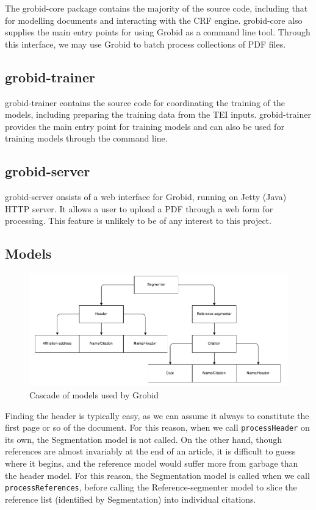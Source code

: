 \documentclass[11pt, oneside]{scrartcl}   	%
\begin{document}
The grobid-core package contains the majority of the source code, including that for modelling documents and interacting with the CRF engine. grobid-core also supplies the main entry points for using Grobid as a command line tool. Through this interface, we may use Grobid to batch process collections of PDF files.

\subsection{grobid-trainer}

grobid-trainer contains the source code for coordinating the training of the models, including preparing the training data from the TEI inputs. grobid-trainer provides the main entry point for training models and can also be used for training models through the command line.

\subsection{grobid-server}

grobid-server onsists of a web interface for Grobid, running on Jetty (Java) HTTP server. It allows a user to upload a PDF through a web form for processing. This feature is unlikely to be of any interest to this project.

\subsection{Models}

\begin{figure}[!ht]
\center
\includegraphics[width=7in]{figures/cascade.pdf}
\caption{Cascade of models used by Grobid}
\label{fig:cascade}
\end{figure}

Finding the header is typically easy, as we can assume it always to constitute the first page or so of the document. For this reason, when we call \texttt{processHeader} on its own, the Segmentation model is not called. On the other hand, though references are almost invariably at the end of an article, it is difficult to guess where it begins, and the reference model would suffer more from garbage than the header model. For this reason, the Segmentation model is called when we call \texttt{processReferences}, before calling the Reference-segmenter model to slice the reference list (identified by Segmentation) into individual citations.
\end{document}
